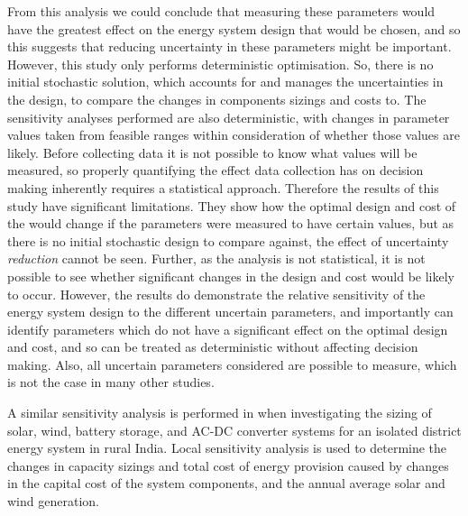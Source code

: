 From this analysis we could conclude that measuring these parameters would have the greatest effect on the energy system design that would be chosen, and so this suggests that reducing uncertainty in these parameters might be important. However, this study only performs deterministic optimisation. So, there is no initial stochastic solution, which accounts for and manages the uncertainties in the design, to compare the changes in components sizings and costs to. The sensitivity analyses performed are also deterministic, with changes in parameter values taken from feasible ranges within consideration of whether those values are likely. Before collecting data it is not possible to know what values will be measured, so properly quantifying the effect data collection has on decision making inherently requires a statistical approach. Therefore the results of this study have significant limitations. They show how the optimal design and cost of the  would change if the parameters were measured to have certain values, but as there is no initial stochastic design to compare against, the effect of uncertainty \textit{reduction} cannot be seen. Further, as the analysis is not statistical, it is not possible to see whether significant changes in the design and cost would be likely to occur. However, the results do demonstrate the relative sensitivity of the energy system design to the different uncertain parameters, and importantly can identify parameters which do not have a significant effect on the optimal design and cost, and so can be treated as deterministic without affecting decision making. Also, all uncertain parameters considered are possible to measure, which is not the case in many other studies.

A similar sensitivity analysis is performed in  when investigating the sizing of solar, wind, battery storage, and AC-DC converter systems for an isolated district energy system in rural India. Local sensitivity analysis is used to determine the changes in capacity sizings and total cost of energy provision caused by changes in the capital cost of the system components, and the annual average solar and wind generation.

